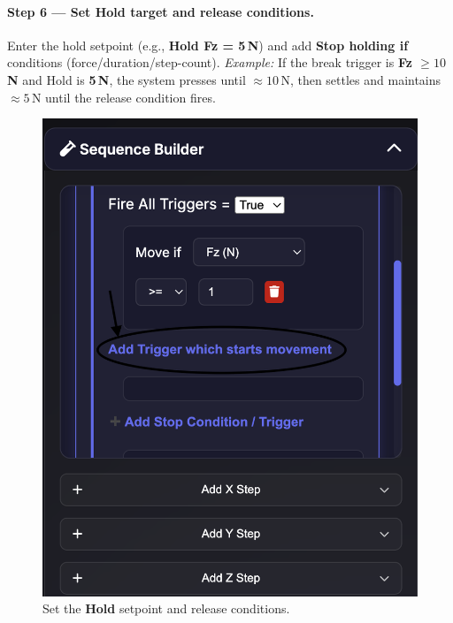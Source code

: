 \documentclass[
    twocolumn,
    fontsize = 10pt,
    parskip = half+,
    headings = small,
    headwidth = text,
    footwidth = text,
]{scrartcl}
\begin{document}
\paragraph{\textbf{Step 6 — Set Hold target and release conditions.}}
Enter the hold setpoint (e.g., \textbf{Hold Fz = 5\,N}) and add \textbf{Stop holding if} conditions (force/duration/step-count). 
\emph{Example:} If the break trigger is \textbf{Fz $\ge 10$\,N} and Hold is \textbf{5\,N}, the system presses until $\approx10$\,N, then settles and maintains $\approx5$\,N until the release condition fires.
\begin{figure}[htbp]\centering
  \includegraphics[width=.9\linewidth]{pics/sb-5.png}
  \caption{Set the \textbf{Hold} setpoint and release conditions.}
  \label{fig:sb-5}
\end{figure}
\end{document}
